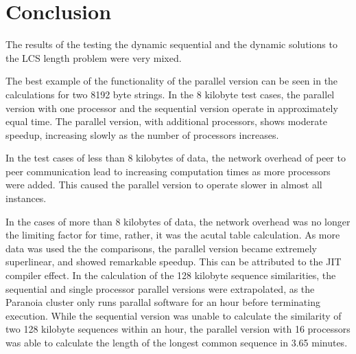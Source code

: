 \section{Conclusion}
The results of the testing the dynamic sequential and the dynamic
solutions to the LCS length problem were very mixed.

The best example of the functionality of the parallel version can be
seen in the calculations for two 8192 byte strings. In the 8 kilobyte
test cases, the parallel version with one processor and the sequential
version operate in approximately equal time. The parallel version,
with additional processors, shows moderate speedup, increasing slowly
as the number of processors increases.

In the test cases of less than 8 kilobytes of data, the network
overhead of peer to peer communication lead to increasing computation
times as more processors were added. This caused the parallel version
to operate slower in almost all instances.

In the cases of more than 8 kilobytes of data, the network overhead
was no longer the limiting factor for time, rather, it was the acutal
table calculation. As more data was used the the comparisons, the
parallel version became extremely superlinear, and showed remarkable
speedup. This can be attributed to the JIT compiler effect. In the
calculation of the 128 kilobyte sequence similarities, the sequential
and single processor parallel versions were extrapolated, as the
Paranoia cluster only runs parallal software for an hour before
terminating execution. While the sequential version was unable to
calculate the similarity of two 128 kilobyte sequences within an hour,
the parallel version with 16 processors was able to calculate the
length of the longest common sequence in 3.65 minutes.
